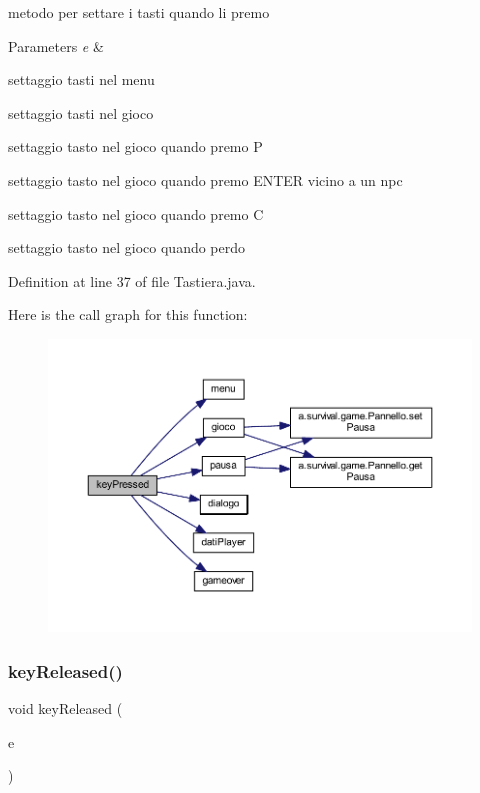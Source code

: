 metodo per settare i tasti quando li premo 


\begin{DoxyParams}{Parameters}
{\em e} & \\
\hline
\end{DoxyParams}
settaggio tasti nel menu

settaggio tasti nel gioco

settaggio tasto nel gioco quando premo P

settaggio tasto nel gioco quando premo E\+N\+T\+ER vicino a un npc

settaggio tasto nel gioco quando premo C

settaggio tasto nel gioco quando perdo

Definition at line 37 of file Tastiera.\+java.

Here is the call graph for this function\+:
\nopagebreak
\begin{figure}[H]
\begin{center}
\leavevmode
\includegraphics[width=350pt]{classa_1_1survival_1_1game_1_1_tastiera_aa12eb1084be2c4d9b03d5f248f00900d_cgraph}
\end{center}
\end{figure}
\mbox{\label{classa_1_1survival_1_1game_1_1_tastiera_af9e79ab3bcfe3fa9df90b04135486f5b}} 
\subsubsection{\texorpdfstring{key\+Released()}{keyReleased()}}
{\footnotesize\ttfamily void key\+Released (\begin{DoxyParamCaption}\item[{Key\+Event}]{e }\end{DoxyParamCaption})}



